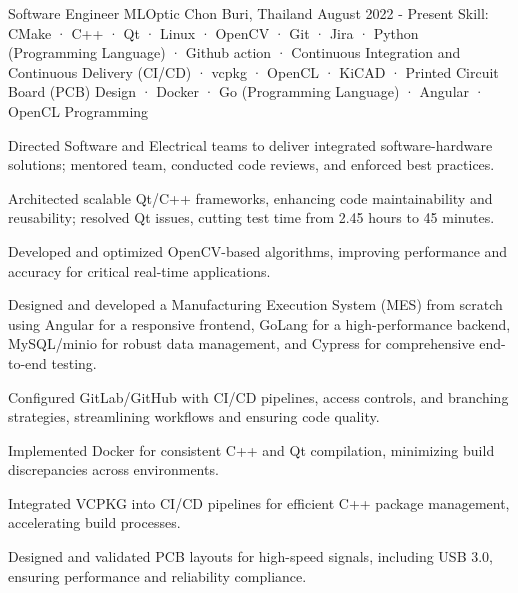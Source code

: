 
\begin{cventries}

  \cventry
    {Software Engineer} %
    {MLOptic} %
    {Chon Buri, Thailand} %
    {August 2022 - Present} %
    {Skill: CMake · C++ · Qt · Linux · OpenCV · Git · Jira · Python (Programming Language) · Github action · Continuous Integration and Continuous Delivery (CI/CD) · vcpkg · OpenCL · KiCAD · Printed Circuit Board (PCB) Design · Docker · Go (Programming Language) · Angular · OpenCL Programming} %
    {
      \begin{cvitems} %
      \item {Directed Software and Electrical teams to deliver integrated software-hardware solutions; mentored team, conducted code reviews, and enforced best practices.}
      \item {Architected scalable Qt/C++ frameworks, enhancing code maintainability and reusability; resolved Qt issues, cutting test time from 2.45 hours to 45 minutes.}
      \item {Developed and optimized OpenCV-based algorithms, improving performance and accuracy for critical real-time applications.}
      \item {Designed and developed a Manufacturing Execution System (MES) from scratch using Angular for a responsive frontend, GoLang for a high-performance backend, MySQL/minio for robust data management, and Cypress for comprehensive end-to-end testing.}
      \item {Configured GitLab/GitHub with CI/CD pipelines, access controls, and branching strategies, streamlining workflows and ensuring code quality.}
      \item {Implemented Docker for consistent C++ and Qt compilation, minimizing build discrepancies across environments.}
      \item {Integrated VCPKG into CI/CD pipelines for efficient C++ package management, accelerating build processes.}
      \item {Designed and validated PCB layouts for high-speed signals, including USB 3.0, ensuring performance and reliability compliance.}

\end{cvitems}}
\end{cventries}
